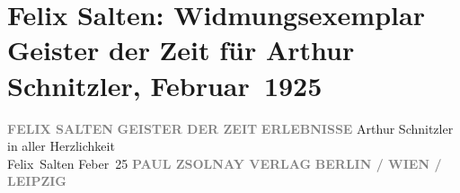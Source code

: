 

         
         \renewcommand{\erwaehntePersonen}{Personen: Felix Salten}
         \renewcommand{\erwaehnteInstitutionen}{Institutionen: Paul Zsolnay Verlag}
         \renewcommand{\erwaehnteOrte}{Orte: Berlin, Leipzig, Wien}
         \renewcommand{\erwaehnteWerke}{Werke: Geister der Zeit. Erlebnisse}
               \section[Felix Salten: Widmungsexemplar Geister der Zeit für Arthur Schnitzler, Februar 1925]{ Felix Salten: Widmungsexemplar Geister der Zeit für Arthur Schnitzler,
               Februar 1925}\nopagebreak{}\rehead{ }\begin{ledgroupsized}[t]{13cm}\normalsize\beginnumbering{} \toendnotes[C]{\smallbreak\pagebreak[2]} 
\toendnotes[C]{\smallbreak}\pstart
           \noindent{}\centering{}{\pb}\textcolor{gray}{\textbf{FELIX SALTEN}}\pend
           \pstart
           \noindent{}\centering{}\textcolor{gray}{\textbf{GEISTER DER ZEIT}}\pend
           \pstart
           \noindent{}\centering{}\textcolor{gray}{\textbf{ERLEBNISSE}}\pend
           {\bigskip}\pstart
           \noindent{}Arthur Schnitzler\pend
           \pstart
           \centering{}in aller Herzlichkeit {\\}\spacefill\mbox{Felix Salten}\pend
           \pstart
           Feber 25\pend
           {\bigskip}\pstart
           \noindent{}\centering{}\textcolor{gray}{\textbf{\label{K_L03042-1v}\label{K_L03042-1h}}}\pend
           \pstart
           \noindent{}\centering{}\textcolor{gray}{\textbf{PAUL ZSOLNAY VERLAG}}\pend
           \pstart
           \noindent{}\centering{}\textcolor{gray}{\textbf{BERLIN / WIEN / LEIPZIG}}\pend
           
         
         \endnumbering{}\end{ledgroupsized}  \newcommand{\dateiname}{L03042}\newcommand{\titel}{Felix Salten: Widmungsexemplar Geister der Zeit für Arthur Schnitzler, Februar 1925}\newcommand{\editorInnen}{Martin Anton Müller und Laura Untner}
      
